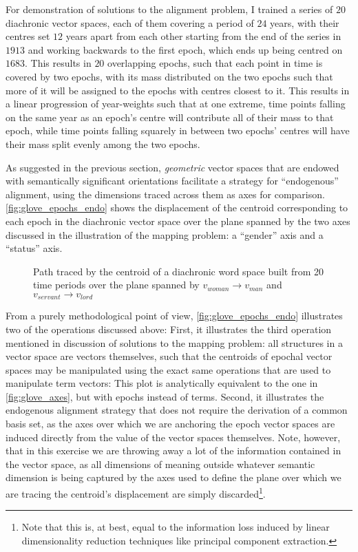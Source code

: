 For demonstration of solutions to the alignment problem, I trained a series of $20$ diachronic vector spaces, each of them covering a period of $24$ years, with their centres set $12$ years apart from each other starting from the end of the series in $1913$ and working backwards to the first epoch, which ends up being centred on $1683$.
This results in $20$ overlapping epochs, such that each point in time is covered by two epochs, with its mass distributed on the two epochs such that more of it will be assigned to the epochs with centres closest to it.
This results in a linear progression of year-weights such that at one extreme, time points falling on the same year as an epoch's centre will contribute all of their mass to that epoch, while time points falling squarely in between two epochs' centres will have their mass split evenly among the two epochs.

As suggested in the previous section, \emph{geometric} vector spaces that are endowed with semantically significant orientations facilitate a strategy for ``endogenous'' alignment, using the dimensions traced across them as axes for comparison.
\autoref{fig:glove_epochs_endo} shows the displacement of the centroid corresponding to each epoch in the diachronic vector space over the plane spanned by the two axes discussed in the illustration of the mapping problem: a ``gender'' axis and a ``status'' axis.

\begin{figure}
    \centerfloat
    
    \caption[Path of the centroid of the word space across 20 time periods]{
        Path traced by the centroid of a diachronic word space built from 20 time periods over the plane spanned by $v_{woman} \rightarrow v_{man}$ and  $v_{servant} \rightarrow v_{lord}$
    }
    \label{fig:glove_epochs_endo}
\end{figure}

From a purely methodological point of view, \autoref{fig:glove_epochs_endo} illustrates two of the operations discussed above:
First, it illustrates the third operation mentioned in discussion of solutions to the mapping problem: all structures in a vector space are vectors themselves, such that the centroids of epochal vector spaces may be manipulated using the exact same operations that are used to manipulate term vectors:
This plot is analytically equivalent to the one in \autoref{fig:glove_axes}, but with epochs instead of terms.
Second, it illustrates the endogenous alignment strategy that does not require the derivation of a common basis set, as the axes over which we are anchoring the epoch vector spaces are induced directly from the value of the vector spaces themselves.
Note, however, that in this exercise we are throwing away a lot of the information contained in the vector space, as all dimensions of meaning outside whatever semantic dimension is being captured by the axes used to define the plane over which we are tracing the centroid's displacement are simply discarded\footnote{
    Note that this is, at best, equal to the information loss induced by linear dimensionality reduction techniques like principal component extraction.
}.

